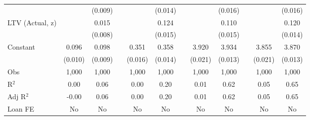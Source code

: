 {\begin{tabular}{l*{11}{c}}
                &                  &  (0.009)         &         &                  &  (0.014)         &         &                  &  (0.016)         &         &                  &  (0.016)         \\
LTV (Actual, z) &                  &    0.015\sym{*}  &         &                  &    0.124\sym{***}&         &                  &    0.110\sym{***}&         &                  &    0.120\sym{***}\\
                &                  &  (0.008)         &         &                  &  (0.015)         &         &                  &  (0.015)         &         &                  &  (0.014)         \\
Constant        &    0.096\sym{***}&    0.098\sym{***}&         &    0.351\sym{***}&    0.358\sym{***}&         &    3.920\sym{***}&    3.934\sym{***}&         &    3.855\sym{***}&    3.870\sym{***}\\
                &  (0.010)         &  (0.009)         &         &  (0.016)         &  (0.014)         &         &  (0.021)         &  (0.013)         &         &  (0.021)         &  (0.013)         \\
\midrule
Obs             &    1,000         &    1,000         &         &    1,000         &    1,000         &         &    1,000         &    1,000         &         &    1,000         &    1,000         \\
R$^2$           &     0.00         &     0.06         &         &     0.00         &     0.20         &         &     0.01         &     0.62         &         &     0.05         &     0.65         \\
Adj R$^2$       &    -0.00         &     0.06         &         &     0.00         &     0.20         &         &     0.01         &     0.62         &         &     0.05         &     0.65         \\
Loan FE         &       No         &       No         &         &       No         &       No         &         &       No         &       No         &         &       No         &       No         \\
\bottomrule
\end{tabular}
}

